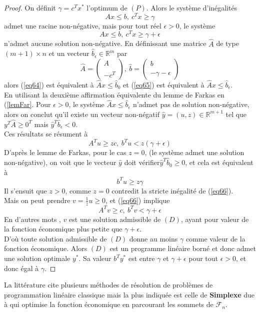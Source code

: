 \documentclass[11pt]{report}
\theoremstyle{styletheorem}
\theoremstyle{styledef}
\theoremstyle{remark}
\newcommand{\R}{\ensuremath{\mathbb{R}}}
\begin{document}
\begin{proof}
	On définit $\gamma = c^T x^*$ l'optimum de $(P)$. Alors le système d'inégalités \begin{equation}\label{eq64}
		Ax \leq b,\ c^T x \geq \gamma
	\end{equation}
	admet une racine non-négative, mais pour tout réel $\epsilon >0$, le système \begin{equation}\label{eq65}
		Ax\leq b,\ c^T x \geq \gamma + \epsilon
	\end{equation}
	n'admet aucune solution non-négative. En définissant une matrice $\hat{A}$ de type $(m+1)\times n$ et un vecteur $\hat{b}_\epsilon \in \R^m$ par $$\hat{A} = \begin{pmatrix}
		A\\ \\ -c^T
	\end{pmatrix},\ \hat{b} = \begin{pmatrix}
		b\\ \\ -\gamma - \epsilon
	\end{pmatrix}$$
	alors (\ref{eq64}) est équivalent à $\hat{A}x \leq \hat{b}_0$ et (\ref{eq65}) est équivalent à $\hat{A}x \leq \hat{b}_\epsilon$.\\
	En utilisant la deuxième affirmation équivalente du lemme de Farkas en (\ref{lemFar}. Pour $\epsilon >0$, le système $\hat{A}x \leq \hat{b}_\epsilon$ n'admet pas de solution non-négative, alors on conclut qu'il existe un vecteur non-négatif $\hat{y}=(u,z) \in \R^{m+1}$ tel que $y^T \hat{A} \geq 0^T$ mais $\hat{y}^T \hat{b}_\epsilon <0$.\\ Ces résultats se résument à 
	\begin{equation}\label{eq66}
		A^T u \geq zc,\ b^T u < z(\gamma + \epsilon)
	\end{equation}
	D'après le lemme de Farkas, pour le cas $z=0$, (le système  admet une solution non-négative), on voit que le vecteur $\hat{y}$ doit vérifier$\hat{y}^T \hat{b}_0 \geq 0$, et cela est équivalent à $$b^Tu \geq z\gamma$$
	Il s'ensuit que $z>0$, comme $z=0$ contredit la stricte inégalité de  (\ref{eq66}).\\
	Mais on peut prendre $v= \frac{1}{z} u \geq 0$, et (\ref{eq66}) implique 
	$$A^Tv \geq c, \ b^Tv < \gamma + \epsilon$$
	En d'autres mots , $v$ est une solution admissible de $(D)$, ayant pour valeur de la fonction économique plus petite que $\gamma + \epsilon$.\\
	D'où toute solution admissible de $(D)$  donne au moins $\gamma$ comme valeur de la fonction économique. Alors $(D)$ est un programme linéaire borné et donc admet une solution optimale $y^*$. Sa valeur $b^T y^*$ est entre $\gamma$ et $\gamma + \epsilon$ pour tout $\epsilon >0$, et donc égal à $\gamma$.
	
\end{proof}
La littérature cite plusieurs méthodes de résolution de problèmes de programmation linéaire classique mais la plus indiquée est celle de \textbf{Simplexe} due à  qui optimise la fonction économique en parcourant les sommets de $\mathcal{F}_n$. 
\end{document}
